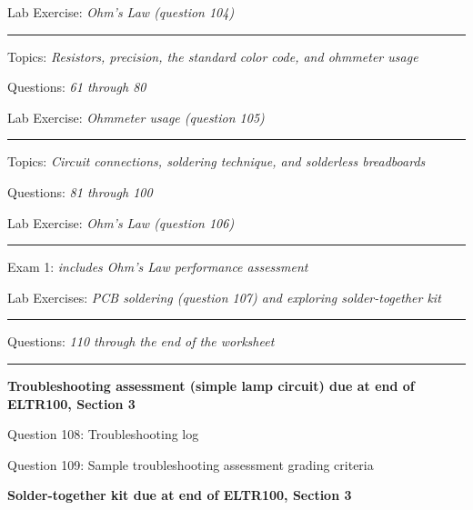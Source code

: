 \hskip 10pt Lab Exercise: {\it Ohm's Law (question 104)}
 
\vskip 10pt
\hrule \vskip 5pt
\noindent
{}

\hskip 10pt Topics: {\it Resistors, precision, the standard color code, and ohmmeter usage}
 
\hskip 10pt Questions: {\it 61 through 80}
 
\hskip 10pt Lab Exercise: {\it Ohmmeter usage (question 105)}
 

\vskip 10pt
\hrule \vskip 5pt
\noindent
{}

\hskip 10pt Topics: {\it Circuit connections, soldering technique, and solderless breadboards}
 
\hskip 10pt Questions: {\it 81 through 100}
 
\hskip 10pt Lab Exercise: {\it Ohm's Law (question 106)}
 


\vskip 10pt
\hrule \vskip 5pt
\noindent
{}

\hskip 10pt Exam 1: {\it includes Ohm's Law performance assessment}
 
\hskip 10pt Lab Exercises: {\it PCB soldering (question 107) and exploring solder-together kit}
 
\vskip 10pt
\hrule \vskip 5pt
\noindent
{}

\hskip 10pt Questions: {\it 110 through the end of the worksheet}
 
\vskip 10pt
\hrule \vskip 5pt
\noindent
{}

\hskip 10pt {\bf Troubleshooting assessment (simple lamp circuit) due at end of ELTR100, Section 3}
 
\hskip 10pt Question 108: Troubleshooting log
 
\hskip 10pt Question 109: Sample troubleshooting assessment grading criteria
 
\hskip 10pt {\bf Solder-together kit due at end of ELTR100, Section 3}

\vskip 10pt




